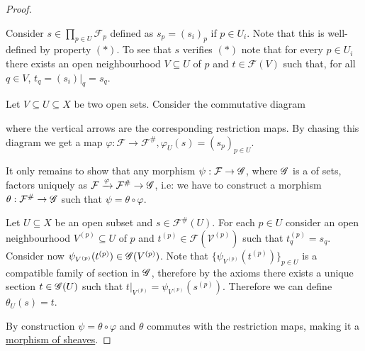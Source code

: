 \documentclass[../main.tex]{subfiles}
\begin{document}
\begin{proof}
\begin{enumerate}
          Consider \(s \in \prod_{p \in U} \mathcal{F}_{p}\) defined as \(s_{p} = (s_{i})_{p}\) if \(p \in U_{i}\). Note that this is well-defined by property \((\ast)\).
          To see that \(s\) verifies \((\ast)\) note that for every \(p \in U_{i}\) there exists an open neighbourhood \(V \subseteq U\) of \(p\) and \(t \in \mathcal{F}(V)\) such that, for all \(q \in V\), \(t_{q} = (s_{i})|_{q} = s_{q}\).
  \end{enumerate}

  Let \(V \subseteq U \subseteq X\) be two open sets. Consider the commutative diagram
  \begin{center}
  \end{center}
  where the vertical arrows are the corresponding restriction maps.
  By chasing this diagram we get a map \(\varphi: \mathcal{F} \to \mathcal{F}^{\#}, \varphi_{U}(s) = (s_{p})_{p \in U}\).

  It only remains to show that any morphism \(\psi: \mathcal{F} \to \mathscr{G}\), where \(\mathscr{G}\) is a  of sets, factors uniquely as \(\mathcal{F} \xrightarrow{\varphi} \mathcal{F}^{\#} \to \mathscr{G}\), i.e: we have to construct a morphism \(\theta: \mathcal{F}^{\#} \to \mathscr{G}\) such that \(\psi = \theta \circ \varphi\).

  Let \(U \subseteq X\) be an open subset and \(s \in \mathcal{F}^{\#}(U)\).
  For each \(p \in U\) consider an open neighbourhood \(V^{(p)} \subseteq U\) of \(p\) and \(t^{(p)} \in \mathcal{F}(\mathcal{V}^{(p)})\) such that \(t_{q}^{(p)} = s_{q}\).
  Consider now \(\psi_{V^{(p)}}(t^{(p)}) \in \mathscr{G}(V^{(p)})\).
  Note that \(\{\psi_{V^{(p)}}(t^{(p)})\}_{p \in U}\) is a compatible family of section in \(\mathscr{G}\), therefore by the  axioms there exists a unique section \(t \in \mathscr{G}(U)\) such that \(t|_{V^{(p)}} = \psi_{V^{(p)}}(s^{(p)})\).
  Therefore we can define \(\theta_{U}(s) = t\).

  By construction \(\psi = \theta \circ \varphi\) and \(\theta\) commutes with the restriction maps, making it a \hyperref[def:sheaf]{morphism of sheaves}.


\end{proof}
\end{document}
